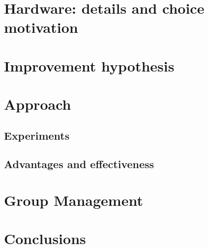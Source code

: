 \documentclass{article}
\begin{document}
\section{Hardware: details and choice motivation}

\section{Improvement hypothesis}

\section{Approach}

	\subsection{Experiments}
	
	\subsection{Advantages and effectiveness}

\section{Group Management}

\section{Conclusions}
\end{document}
